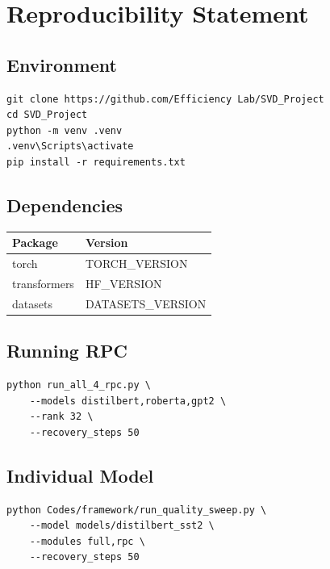 
\section{Reproducibility Statement}

\subsection{Environment}

\begin{lstlisting}
git clone https://github.com/Efficiency Lab/SVD_Project
cd SVD_Project
python -m venv .venv
.venv\Scripts\activate
pip install -r requirements.txt
\end{lstlisting}

\subsection{Dependencies}

\begin{table}[H]
\centering
\small
\begin{tabular}{ll}
\toprule
\textbf{Package} & \textbf{Version} \\
\midrule
torch & {{TORCH\_VERSION}} \\
transformers & {{HF\_VERSION}} \\
datasets & {{DATASETS\_VERSION}} \\
\bottomrule
\end{tabular}
\end{table}

\subsection{Running RPC}

\begin{lstlisting}
python run_all_4_rpc.py \
    --models distilbert,roberta,gpt2 \
    --rank 32 \
    --recovery_steps 50
\end{lstlisting}

\subsection{Individual Model}

\begin{lstlisting}
python Codes/framework/run_quality_sweep.py \
    --model models/distilbert_sst2 \
    --modules full,rpc \
    --recovery_steps 50
\end{lstlisting}

